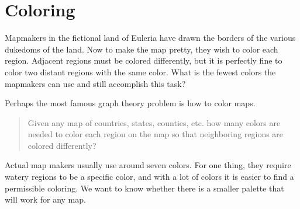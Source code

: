 \documentclass[12pt]{article}
\begin{document}
\section{Coloring}

\begin{activity}
Mapmakers in the fictional land of Euleria have drawn the borders of the various dukedoms of the land.  Now to make the map pretty, they wish to color each region.  Adjacent regions must be colored differently, but it is perfectly fine to color two distant regions with the same color.  What is the fewest colors the mapmakers can use and still accomplish this task?

\begin{center}
\end{center}

\end{activity}

Perhaps the most famous graph theory problem is how to color maps.  

\begin{quote}
 Given any map of countries, states, counties, etc. how many colors are needed to color each region on the map so that neighboring regions are colored differently?
\end{quote}

Actual map makers usually use around seven colors.  For one thing, they require watery regions to be a specific color, and with a lot of colors it is easier to find a permissible coloring.  We want to know whether there is a smaller palette that will work for any map.
\end{document}
